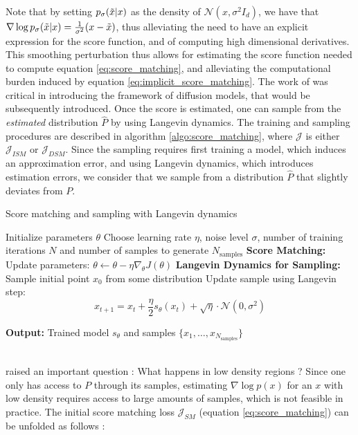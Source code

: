 Note that by setting $p_{\sigma}(\Tilde{x}|x)$ as the density of $\mathcal{N}(x,\sigma^{2}I_{d})$, we have that $\nabla \log p_{\sigma}(\Tilde{x}|x) = \frac{1}{\sigma^{2}} (x - \Tilde{x})$, thus alleviating the need to have an explicit expression for the score function, and of computing high dimensional derivatives. This smoothing perturbation thus allows for estimating the score function needed to compute equation \ref{eq:score_matching}, and alleviating the computational burden induced by equation \ref{eq:implicit_score_matching}. The work of \citep{vincent_connection_2011} was critical in introducing the framework of diffusion models, that would be subsequently introduced.
Once the score is estimated, one can sample from the \textit{estimated} distribution $\hat{P}$ by using Langevin dynamics. The training and sampling procedures are described in algorithm \ref{algo:score_matching}, where $\mathcal{J}$ is either $\mathcal{J}_{ISM}$ or $\mathcal{J}_{DSM}$. Since the sampling requires first training a model, which induces an approximation error, and using Langevin dynamics, which introduces estimation errors, we consider that we sample from a distribution $\hat{P}$ that slightly deviates from $P$.
\begin{algorithm}
\caption{Score matching and sampling with Langevin dynamics}
\label{algo:score_matching}
\begin{algorithmic}[1]
\State Initialize parameters \( \theta \)
\State Choose learning rate \( \eta \), noise level \( \sigma \), number of training iterations \( N \) and number of samples to generate $N_{\text{samples}}$
\State \textbf{Score Matching:}
    \State Update parameters: \( \theta \leftarrow \theta - \eta \nabla_\theta J(\theta) \)
\EndFor
\State \textbf{Langevin Dynamics for Sampling:}
\State Sample initial point \( x_0 \) from some distribution
        \State Update sample using Langevin step:
        \[
        x_{t+1} = x_t + \frac{\eta}{2}s_{\theta}(x_{t}) + \sqrt{\eta} \cdot \mathcal{N}(0, \sigma^2)
        \]
    \EndFor
\EndFor

\State \textbf{Output:} Trained model \( s_\theta \) and samples \( \{x_1, \dots, x_{N_{\text{samples}}}\} \)

\end{algorithmic}
\end{algorithm}
\\
\citep{song2021scorebasedgenerativemodelingstochastic} raised an important question : What happens in low density regions ? Since one only has access to $P$ through its samples, estimating $\nabla \log p(x)$ for an $x$ with low density requires access to large amounts of samples, which is not feasible in practice. The initial score matching loss $\mathcal{J}_{SM}$ (equation \ref{eq:score_matching}) can be unfolded as follows : 
